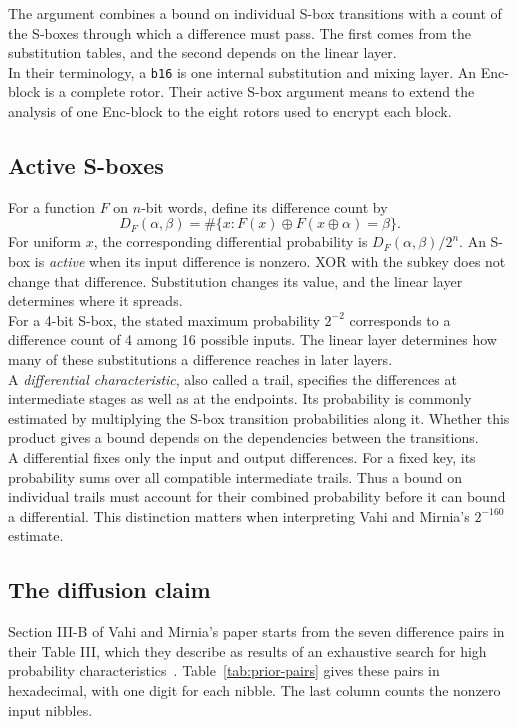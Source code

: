 \documentclass[11pt]{article}
\newcommand{\xor}{\mathbin\oplus}
\begin{document}
The argument combines a bound on individual S-box transitions with a
count of the S-boxes through which a difference must pass. The first
comes from the substitution tables, and the second depends on the linear
layer.\\

In their terminology, a \texttt{b16} is one internal substitution and
mixing layer. An Enc-block is a complete rotor. Their active S-box
argument means to extend the analysis of one Enc-block to the eight rotors used
to encrypt each block.

\subsection{Active S-boxes}
For a function \(F\) on \(n\)-bit words, define its difference count by
\[
D_F(\alpha,\beta)
 =\#\{x:F(x)\xor F(x\xor\alpha)=\beta\}.
\]
For uniform \(x\), the corresponding differential probability is
\(D_F(\alpha,\beta)/2^n\). An S-box is \emph{active} when its input
difference is nonzero. XOR with the subkey does not change that
difference. Substitution changes its value, and the linear layer
determines where it spreads.\\

For a 4-bit S-box, the stated maximum probability \(2^{-2}\)
corresponds to a difference count of 4 among 16 possible
inputs. The linear layer determines
how many of these substitutions a difference reaches in later layers.\\

A \emph{differential characteristic}, also called a trail, specifies
the differences at intermediate stages as well as at the endpoints.
Its probability is commonly estimated by multiplying the S-box transition
probabilities along it. Whether this product gives a bound depends on
the dependencies between the transitions.\\

A differential fixes only the input and output differences. For a
fixed key, its probability sums over all compatible intermediate
trails. Thus a bound on individual trails must account for their combined
probability before it can bound a differential. This distinction matters
when interpreting Vahi and Mirnia's \(2^{-160}\) estimate.\\

\subsection{The diffusion claim}
Section III-B of Vahi and Mirnia's paper starts from the seven difference
pairs in their Table III, which they describe as results of an exhaustive
search for high probability characteristics~\cite{separ-differential}.
Table~\ref{tab:prior-pairs} gives these pairs in hexadecimal, with one
digit for each nibble. The last column counts the nonzero input nibbles.
\end{document}
